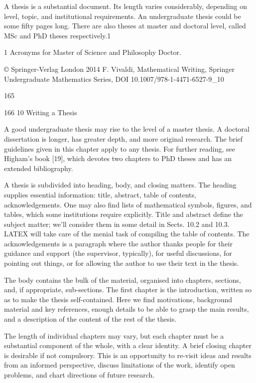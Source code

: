 \documentclass[11pt]{article}
\theoremstyle{plain}
\theoremstyle{definition}
\begin{document}
A thesis is a substantial document. Its length varies considerably, depending on level, topic, and institutional requirements. An undergraduate thesis could be some fifty pages long. There are also theses at master and doctoral level, called MSc and PhD theses respectively.1

1 Acronyms for Master of Science and Philosophy Doctor.

© Springer-Verlag London 2014 F. Vivaldi, Mathematical Writing, Springer Undergraduate Mathematics Series, DOI 10.1007/978-1-4471-6527-9\_10

165

166 10 Writing a Thesis

A good undergraduate thesis may rise to the level of a master thesis. A doctoral dissertation is longer, has greater depth, and more original research. The brief guidelines given in this chapter apply to any thesis. For further reading, see Higham's book [19], which devotes two chapters to PhD theses and has an extended bibliography.

A thesis is subdivided into heading, body, and closing matters. The heading supplies essential information: title, abstract, table of contents, acknowledgements. One may also find lists of mathematical symbols, figures, and tables, which some institutions require explicitly. Title and abstract define the subject matter; we'll consider them in some detail in Sects. 10.2 and 10.3. LATEX will take care of the menial task of compiling the table of contents. The acknowledgements is a paragraph where the author thanks people for their guidance and support (the supervisor, typically), for useful discussions, for pointing out things, or for allowing the author to use their text in the thesis.

The body contains the bulk of the material, organised into chapters, sections, and, if appropriate, sub-sections. The first chapter is the introduction, written so as to make the thesis self-contained. Here we find motivations, background material and key references, enough details to be able to grasp the main results, and a description of the content of the rest of the thesis.

The length of individual chapters may vary, but each chapter must be a substantial component of the whole, with a clear identity. A brief closing chapter is desirable if not compulsory. This is an opportunity to re-visit ideas and results from an informed perspective, discuss limitations of the work, identify open problems, and chart directions of future research.
\end{document}
